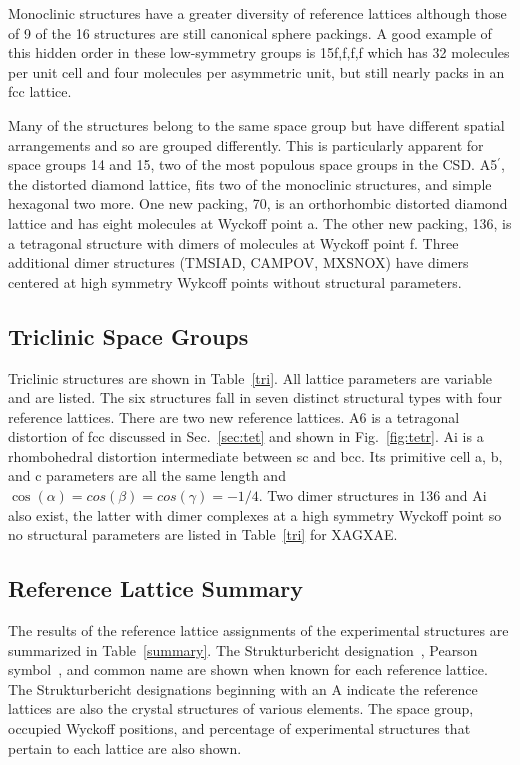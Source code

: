 \documentclass[preprint]{revtex4}              %
\begin{document}
Monoclinic structures have a greater diversity of reference lattices
although those of 9 of the 16 structures are still canonical sphere
packings. A good example of this hidden order in these low-symmetry
groups is 15f,f,f,f which has 32 molecules per unit cell and four
molecules per asymmetric unit, but still nearly packs in an fcc
lattice.

Many of the structures belong to the same space group but have
different spatial arrangements and so are grouped differently. This
is particularly apparent for space groups 14 and 15, two of the most
populous space groups in the CSD. A5$^\prime$, the distorted diamond
lattice, fits two of the monoclinic structures, and simple hexagonal
two more.  One new packing, 70, is an orthorhombic distorted diamond
lattice and has eight molecules at Wyckoff point a. The other new
packing, 136, is a tetragonal structure with dimers of molecules at
Wyckoff point f. Three additional dimer structures (TMSIAD, CAMPOV,
MXSNOX) have dimers centered at high symmetry Wykcoff points without
structural parameters.

\subsection{Triclinic Space Groups}

Triclinic structures are shown in Table~\ref{tri}. All lattice
parameters are variable and are listed.  The six structures fall in
seven distinct structural types with four reference lattices. There
are two new reference lattices. A6 is a tetragonal distortion of fcc
discussed in Sec.~\ref{sec:tet} and shown in Fig.~\ref{fig:tetr}. Ai
is a rhombohedral distortion intermediate between sc and bcc. Its
primitive cell a, b, and c parameters are all the same length and
$\cos(\alpha)=cos(\beta)=cos(\gamma)=-1/4$. Two dimer structures in
136 and Ai also exist, the latter with dimer complexes at a high
symmetry Wyckoff point so no structural parameters are listed in
Table~\ref{tri} for XAGXAE.

\subsection{Reference Lattice Summary}

The results of the reference lattice assignments of the experimental
structures are summarized in Table~\ref{summary}. The
Strukturbericht designation~\cite{Wilson51}, Pearson
symbol~\cite{Pearson67}, and common name are shown when known for
each reference lattice. The Strukturbericht designations beginning
with an A indicate the reference lattices are also the crystal
structures of various elements. The space group, occupied Wyckoff
positions, and percentage of experimental structures that pertain to
each lattice are also shown.
\end{document}
